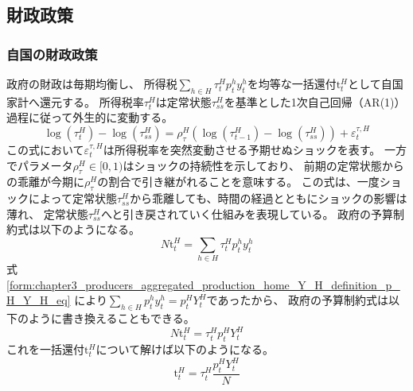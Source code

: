 
\subsection{財政政策}
\label{sec:chapter3_policies_fiscal}

\subsubsection{自国の財政政策}
\label{sec:chapter3_policies_fiscal_home}
政府の財政は毎期均衡し、
所得税\(\sum_{h\in H}\tau_t^Hp_t^hy_t^h\)を均等な一括還付\(\mathrm{t}_t^H\)として自国家計へ還元する。
所得税率\(\tau_t^H\)は定常状態\(\tau_{ss}^H\)を基準とした1次自己回帰（AR(1)）過程に従って外生的に変動する。
\begin{equation}
\label{form:chapter3_policies_fiscal_home_tau_eq}
    \log(\tau_t^H)-\log(\tau_{ss}^H)=\rho_{\tau}^H\left(\log(\tau_{t-1}^H)-\log(\tau_{ss}^H)\right)+\varepsilon_t^{\tau,H}
\end{equation}
この式において\(\varepsilon_t^{\tau,H}\)は所得税率を突然変動させる予期せぬショックを表す。
一方でパラメータ\(\rho_{\tau}^H \in [0,1)\)はショックの持続性を示しており、
前期の定常状態からの乖離が今期に\(\rho_{\tau}^H\)の割合で引き継がれることを意味する。
この式は、一度ショックによって定常状態\(\tau_{ss}^H\)から乖離しても、時間の経過とともにショックの影響は薄れ、
定常状態\(\tau_{ss}^H\)へと引き戻されていく仕組みを表現している。
政府の予算制約式は以下のようになる。
\begin{equation}
\label{form:chapter3_policies_fiscal_home_budget_eq}
    N\mathrm{t}_t^H=\sum_{h\in H}\tau_t^Hp_t^hy_t^h
\end{equation}
式
\eqref{form:chapter3_producers_aggregated_production_home_Y_H_definition_p_H_Y_H_eq}
により\(\sum_{h\in H}p_t^hy_t^h=p_t^HY_t^H\)であったから、
政府の予算制約式は以下のように書き換えることもできる。
\begin{equation}
\label{form:chapter3_policies_fiscal_home_budget_modified_eq}
    N\mathrm{t}_t^H=\tau_t^Hp_t^HY_t^H
\end{equation}
これを一括還付\(\mathrm{t}_t^H\)について解けば以下のようになる。
\begin{equation}
\label{form:chapter3_policies_fiscal_home_budget_modified2_eq}
    \mathrm{t}_t^H=\tau_t^H\frac{p_t^HY_t^H}{N}
\end{equation}

